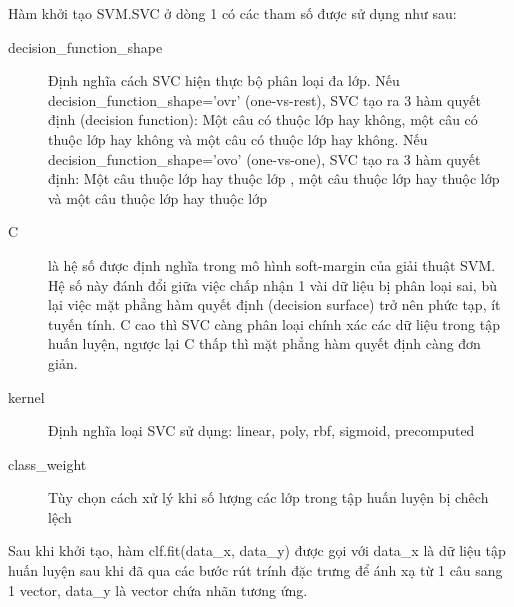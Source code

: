 Hàm khởi tạo SVM.SVC ở dòng 1 có các tham số được sử dụng như sau:
\begin{description}
\item[decision\_function\_shape] Định nghĩa cách SVC hiện thực bộ phân loại đa lớp. Nếu decision\_function\_shape='ovr' (one-vs-rest), SVC tạo ra 3 hàm quyết định (decision function): Một câu có thuộc lớp \tichcuc hay không, một câu có thuộc lớp \tieucuc hay không và một câu có thuộc lớp \trungtinh hay không. Nếu decision\_function\_shape='ovo' (one-vs-one), SVC tạo ra 3 hàm quyết định: Một câu thuộc lớp \tichcuc hay thuộc lớp \tieucuc, một câu thuộc lớp \tieucuc hay thuộc lớp \trungtinh và một câu thuộc lớp \trungtinh hay thuộc lớp \tichcuc
\item[C] là hệ số được định nghĩa trong mô hình soft-margin của giải thuật SVM. Hệ số này đánh đổi giữa việc chấp nhận 1 vài dữ liệu bị phân loại sai, bù lại việc mặt phẳng hàm quyết định (decision surface) trở nên phức tạp, ít tuyến tính. C cao thì SVC càng phân loại chính xác các dữ liệu trong tập huấn luyện, ngược lại C thấp thì mặt phẳng hàm quyết định càng đơn giản.
\item[kernel] Định nghĩa loại  SVC sử dụng: linear, poly, rbf, sigmoid, precomputed
\item[class\_weight] Tùy chọn cách xử lý khi số lượng các lớp trong tập huấn luyện bị chêch lệch
\end{description}

Sau khi khởi tạo, hàm clf.fit(data\_x, data\_y) được gọi với data\_x là dữ liệu tập huấn luyện sau khi đã qua các bước rút trính đặc trưng để ánh xạ từ 1 câu sang 1 vector, data\_y là vector chứa nhãn tương ứng.
